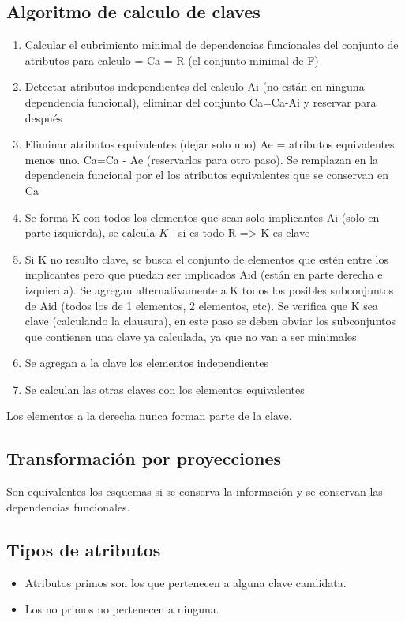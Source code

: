 \subsection*{Algoritmo de calculo de claves}
\begin{enumerate}
\item Calcular el cubrimiento minimal de dependencias funcionales del conjunto de atributos para calculo = Ca = R (el conjunto minimal de F)
\item Detectar atributos independientes del calculo Ai (no están en ninguna dependencia funcional), eliminar del conjunto Ca=Ca-Ai y reservar para después
\item Eliminar atributos equivalentes (dejar solo uno) Ae = atributos equivalentes menos uno. Ca=Ca - Ae (reservarlos para otro paso). Se remplazan en la dependencia funcional por el los atributos equivalentes que se conservan en Ca
\item Se forma K con todos los elementos que sean solo implicantes Ai (solo en parte izquierda), se calcula $K^+$ si es todo R => K es clave
\item Si K no resulto clave, se busca el conjunto de elementos que estén entre los implicantes pero que puedan ser implicados Aid (están en parte derecha e izquierda). Se agregan alternativamente a K todos los posibles subconjuntos de Aid (todos los de 1 elementos, 2 elementos, etc). Se verifica que K sea clave (calculando la clausura), en este paso se deben obviar los subconjuntos que contienen una clave ya calculada, ya que no van a ser minimales.
\item Se agregan a la clave los elementos independientes
\item Se calculan las otras claves con los elementos equivalentes
\end{enumerate}

\medskip
Los elementos a la derecha nunca forman parte de la clave.

\subsection*{Transformación por proyecciones}
Son equivalentes los esquemas si se conserva la información y se conservan las dependencias funcionales.

\subsection*{Tipos de atributos}
\begin{itemize}
\item Atributos primos son los que pertenecen a alguna clave candidata.
\item Los no primos no pertenecen a ninguna.
\end{itemize}


